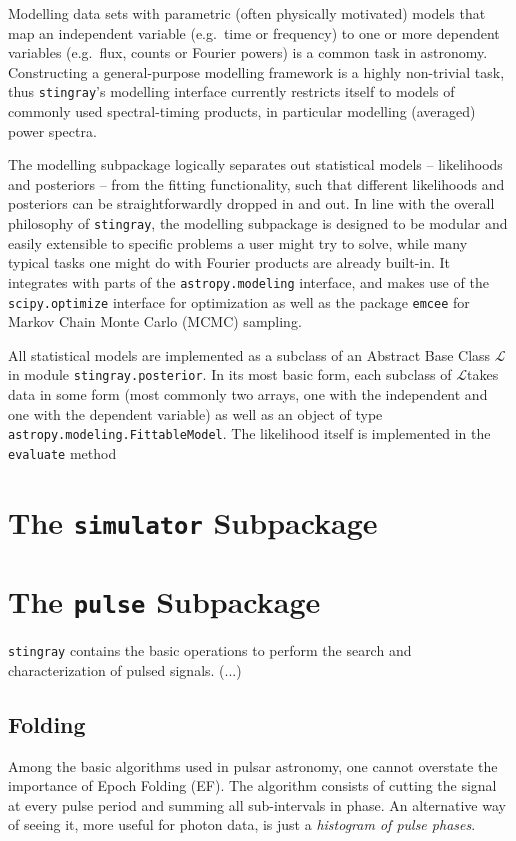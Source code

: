 \documentclass[12pt]{emulateapj}
\newcommand{\likelihood}{\ensuremath{{\mathcal L}}}
\newcommand{\stingray}{\texttt{stingray}\xspace}
\newcommand{\likelihood}{\texttt{Likelihood}\xspace}
\begin{document}
Modelling data sets with parametric (often physically motivated) models that map an independent variable (e.g.\ time or frequency) to one or more dependent variables (e.g.\ flux, counts or Fourier powers) is a common task in astronomy. Constructing a general-purpose modelling framework is a highly non-trivial task, thus \stingray's modelling interface currently restricts itself to models of commonly used spectral-timing products, in particular modelling (averaged) power spectra. 

The modelling subpackage logically separates out statistical models -- likelihoods and posteriors -- from the fitting functionality, such that different likelihoods and posteriors can be straightforwardly dropped in and out. In line with the overall philosophy of \stingray, the modelling subpackage is designed to be modular and easily extensible to specific problems a user might try to solve, while many typical tasks one might do with Fourier products are already built-in. It integrates with parts of the \verb|astropy.modeling| interface, and makes use of the \verb|scipy.optimize| interface for optimization as well as the package \texttt{emcee} for Markov Chain Monte Carlo (MCMC) sampling.

All statistical models are implemented as a subclass of an Abstract Base Class \likelihood in module \verb|stingray.posterior|. In its most basic form, each subclass of \likelihood takes data in some form (most commonly two arrays, one with the independent and one with the dependent variable) as well as an object of type \verb|astropy.modeling.FittableModel|. The likelihood itself is implemented in the \texttt{evaluate} method






\section{The \texttt{simulator} Subpackage}
\label{sec:simulator}

\section{The \texttt{pulse} Subpackage}
\label{sec:pulsar}
\stingray contains the basic operations to perform the search and characterization of pulsed signals.
(...)
\subsection{Folding}
Among the basic algorithms used in pulsar astronomy, one cannot overstate the importance of Epoch Folding (EF).
The algorithm consists of cutting the signal at every pulse period and summing all sub-intervals in phase. 
An alternative way of seeing it, more useful for photon data, is just a \textit {histogram of pulse phases}.
\end{document}

